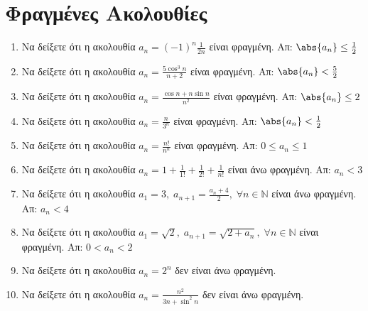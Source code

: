 


\everymath{\displaystyle}
\pagestyle{vangelis}



\begin{center}
  \minibox[c]{\large \bfseries \textcolor{Col1}{Ακολουθίες}\\ \large 
  \textcolor{Col1}{Ασκήσεις}}
\end{center}

\vspace{\baselineskip}


\setcounter{chapter}{1}
\section{Φραγμένες Ακολουθίες}

\begin{enumerate}
  \item Να δείξετε ότι η ακολουθία $ a_{n} = (-1)^{n}\frac{1}{2n} $ είναι 
    φραγμένη.
    \hfill Απ: $ \abs{a_{n}} \leq \frac{1}{2} $ 
  \item Να δείξετε ότι η ακολουθία $ a_{n} = \frac{5 \cos^{3}{n}}{n+2} $ 
    είναι φραγμένη.
    \hfill Απ: $ \abs{a_{n}} < \frac{5}{2}  $ 
  \item Να δείξετε ότι η ακολουθία $ a_{n} = \frac{\cos{n} + n \sin{n}}{n^{2}} $ 
    είναι φραγμένη. 
    \hfill Απ: $ \abs{a_{n}} \leq 2 $ 
  \item Να δείξετε ότι η ακολουθία $ a_{n} = \frac{n}{3^{n}} $ είναι 
    φραγμένη. 
    \hfill Απ: $ \abs{a_{n}}< \frac{1}{2} $
  \item Να δείξετε ότι η ακολουθία $ a_{n} = \frac{n!}{n^{n}} $ είναι 
    φραγμένη. 
    \hfill Απ: $ 0 \leq a_{n} \leq 1 $ 
  \item Να δείξετε ότι η ακολουθία $ a_{n} = 1 + \frac{1}{1!} +
    \frac{1}{2!} + \frac{1}{n!} $ είναι άνω φραγμένη.
    \hfill Απ: $ a_{n} < 3 $ 
  \item Να δείξετε ότι η ακολουθία $ a_{1} = 3, \; a_{n+1} =
    \frac{a_{n}+4}{2}, \; \forall n \in \mathbb{N} $ είναι άνω φραγμένη.
    \hfill Απ: $ a_{n} < 4 $ 
  \item Να δείξετε ότι η ακολουθία $ a_{1} = \sqrt{2}, \; a_{n+1} =
    \sqrt{2+ a_{n}}, \; \forall n \in \mathbb{N} $ είναι φραγμένη.
    \hfill Απ: $ 0 < a_{n} < 2$ 
  \item Να δείξετε ότι η ακολουθία $ a_{n} = 2^{n} $ δεν είναι άνω 
    φραγμένη.
  \item Να δείξετε ότι η ακολουθία $ a_{n} = \frac{n^{2}}{3n+ \sin^{2}{n}} $ δεν 
    είναι άνω φραγμένη.
\end{enumerate}

